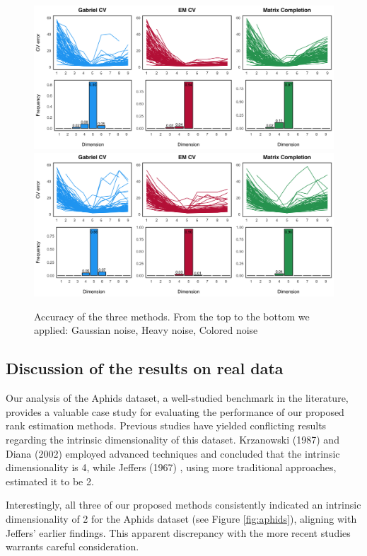 \documentclass{article}
\begin{document}
\begin{figure}[H]
    \includegraphics[width=\textwidth]{100heavy.png}
    \includegraphics[width=\textwidth]{100colored.png}
    \caption{Accuracy of the three methods. From the top to the bottom we applied: Gaussian noise, Heavy noise, Colored noise}
    \label{fig:accuracy}
\end{figure}



\subsection{Discussion of the results on real data}
Our analysis of the Aphids dataset, a well-studied benchmark in the literature, provides a valuable case 
study for evaluating the performance of our proposed rank estimation methods. Previous studies have yielded 
conflicting results regarding the intrinsic dimensionality of this dataset. Krzanowski (1987) \cite{Krzanowski} 
and Diana (2002) \cite{Diana} employed advanced techniques and concluded that the intrinsic dimensionality is 
4, while Jeffers (1967) \cite{Jeffers}, using more traditional approaches, estimated it to be 2.

Interestingly, all three of our proposed methods consistently indicated an 
intrinsic dimensionality of 2 for the Aphids dataset (see Figure \ref{fig:aphids}), aligning with Jeffers' earlier findings. This apparent 
discrepancy with the more recent studies warrants careful consideration.
\end{document}
